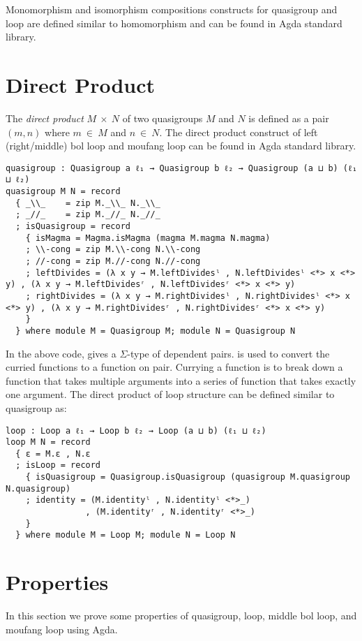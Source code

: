 Monomorphism and isomorphism compositions constructs for quasigroup and loop are
defined similar to homomorphism and can be found in Agda standard library.

\section{Direct Product}
The \textit{direct product} $M \ \times \ N$ of two quasigroups $M$ and $N$ is
defined as a pair $(m,n)$ where $m \ \in \ M$ and $n \ \in \ N$. The direct
product construct of left (right/middle) bol loop and moufang loop can be found
in Agda standard library.
\begin{verbatim}
quasigroup : Quasigroup a ℓ₁ → Quasigroup b ℓ₂ → Quasigroup (a ⊔ b) (ℓ₁ ⊔ ℓ₂)
quasigroup M N = record
  { _\\_    = zip M._\\_ N._\\_
  ; _//_    = zip M._//_ N._//_
  ; isQuasigroup = record
    { isMagma = Magma.isMagma (magma M.magma N.magma)
    ; \\-cong = zip M.\\-cong N.\\-cong
    ; //-cong = zip M.//-cong N.//-cong
    ; leftDivides = (λ x y → M.leftDividesˡ , N.leftDividesˡ <*> x <*> y) , (λ x y → M.leftDividesʳ , N.leftDividesʳ <*> x <*> y)
    ; rightDivides = (λ x y → M.rightDividesˡ , N.rightDividesˡ <*> x <*> y) , (λ x y → M.rightDividesʳ , N.rightDividesʳ <*> x <*> y)
    }
  } where module M = Quasigroup M; module N = Quasigroup N
\end{verbatim}
In the above code,  gives a $\Sigma$-type of dependent pairs.
\inline{<*>} is used to convert the curried functions to a function on pair.
Currying a function is to break down a function that takes multiple arguments
into a series of function that takes exactly one argument. The direct product of
loop structure can be defined similar to quasigroup as:
\begin{verbatim}
loop : Loop a ℓ₁ → Loop b ℓ₂ → Loop (a ⊔ b) (ℓ₁ ⊔ ℓ₂)
loop M N = record
  { ε = M.ε , N.ε
  ; isLoop = record
    { isQuasigroup = Quasigroup.isQuasigroup (quasigroup M.quasigroup N.quasigroup)
    ; identity = (M.identityˡ , N.identityˡ <*>_)
                , (M.identityʳ , N.identityʳ <*>_)
    }
  } where module M = Loop M; module N = Loop N
\end{verbatim}

\section{Properties}
In this section we prove some properties of quasigroup, loop, middle bol loop, and moufang loop using
Agda.
